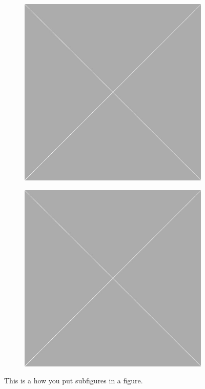 \documentclass[10pt,oneside]{book}
\begin{document}
\begin{figure}
    \centering
    \begin{subfigure}[b]{0.47\linewidth}
      \includegraphics[width=\linewidth]{Pictures/placeholder.jpg}
    \end{subfigure}
    \quad
    \begin{subfigure}[b]{0.47\linewidth}
      \includegraphics[width=\linewidth]{Pictures/placeholder.jpg}
    \end{subfigure}
  \caption{This is a how you put subfigures in a figure.}
\end{figure}
\end{document}

